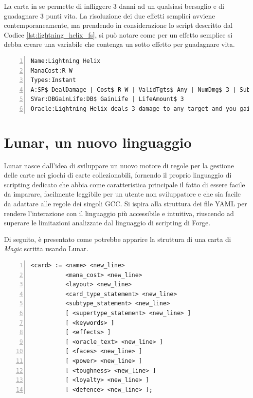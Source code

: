 La carta in se permette di infliggere 3 danni ad un qualsiasi bersaglio e di guadagnare 3 punti vita. La risoluzione dei due effetti semplici avviene contemporaneamente, ma prendendo in considerazione lo script descritto dal Codice \ref{lst:lightning_helix_fs}, si può notare come per un effetto semplice si debba creare una variabile che contenga un sotto effetto per guadagnare vita.

\begin{algorithm}
	\caption{Script della carta in Figura \ref{fig:lightning_helix} in ForgeScript}
	\label{lst:lightning_helix_fs}
	\begin{Verbatim}[numbers=left,breaklines]
Name:Lightning Helix
ManaCost:R W
Types:Instant
A:SP$ DealDamage | Cost$ R W | ValidTgts$ Any | NumDmg$ 3 | SubAbility$ DBGainLife | SpellDescription$ CARDNAME deals 3 damage to any target and you gain 3 life.
SVar:DBGainLife:DB$ GainLife | LifeAmount$ 3
Oracle:Lightning Helix deals 3 damage to any target and you gain 3 life.
	\end{Verbatim}
\end{algorithm}


\section{Lunar, un nuovo linguaggio}\label{sec:lunar_dsl}


Lunar nasce dall'idea di sviluppare un nuovo motore di regole per la gestione delle carte nei giochi di carte collezionabili, fornendo il proprio linguaggio di scripting dedicato che abbia come caratteristica principale il fatto di essere facile da imparare, facilmente leggibile per un utente non sviluppatore e che sia facile da adattare alle regole dei singoli GCC. Si ispira alla struttura dei file YAML per rendere l'interazione con il linguaggio più accessibile e intuitiva, riuscendo ad superare le limitazioni analizzate dal linguaggio di scripting di Forge. 

Di seguito, è presentato come potrebbe apparire la struttura di una carta  di \emph{Magic} scritta usando Lunar.

\begin{algorithm}[ht]
	\caption{Struttura di una carta usando Lunar espressa in EBNF}
	\label{lst:ebnf_card}
	\begin{Verbatim}[numbers=left,breaklines]
<card> := <name> <new_line>
          <mana_cost> <new_line>
          <layout> <new_line> 
          <card_type_statement> <new_line> 
          <subtype_statement> <new_line>
          [ <supertype_statement> <new_line> ]
          [ <keywords> ]
          [ <effects> ]
          [ <oracle_text> <new_line> ]
          [ <faces> <new_line> ]
          [ <power> <new_line> ]
          [ <toughness> <new_line> ]
          [ <loyalty> <new_line> ]
          [ <defence> <new_line> ];
	\end{Verbatim}
\end{algorithm}

